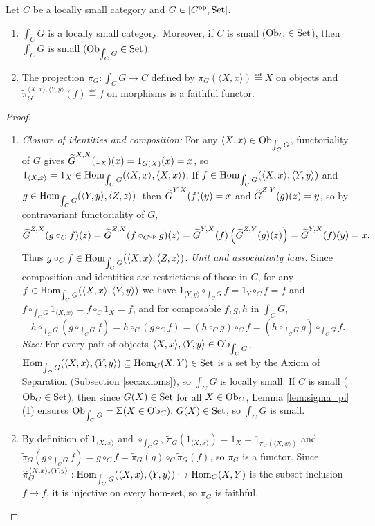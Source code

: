 \documentclass[10pt,a4paper]{article}
\renewcommand{\myprf}{\begin{proof}}
\renewcommand{\myqed}{\end{proof}}
\begin{document}
\begin{lemma}\label{lem:cat_of_elements}
Let $C$ be a locally small category and $G \in [C^{\textrm{op}}, {\textrm{Set}}]$.
\begin{enumerate}
\item $\int_C G$ is a locally small category. Moreover, if $C$ is small (${\textrm{Ob}}_C \in {\textrm{Set}}$), then $\int_C G$ is small (${\textrm{Ob}}_{\int_C G} \in {\textrm{Set}}$).
\item The projection $\pi_G : \int_C G \to C$ defined by $\pi_G(\langle X, x \rangle) \eqdef X$ on objects and $\widetilde{\pi}_G^{\langle X,x\rangle,\langle Y,y\rangle}(f) \eqdef f$ on morphisms is a faithful functor.
\end{enumerate}
\end{lemma}
\myprf
\begin{enumerate}
\item \emph{Closure of identities and composition:} For any $\langle X, x \rangle \in {\textrm{Ob}}_{\int_C G}$, functoriality of $G$ gives ${\widetilde{G}\textrm{}}^{X,X}(1_X)(x) = 1_{G(X)}(x) = x$, so $1_{\langle X,x\rangle} = 1_X \in {\textrm{Hom}}_{\int_C G}(\langle X, x \rangle, \langle X, x \rangle)$. If $f \in {\textrm{Hom}}_{\int_C G}(\langle X, x \rangle, \langle Y, y \rangle)$ and $g \in {\textrm{Hom}}_{\int_C G}(\langle Y, y \rangle, \langle Z, z \rangle)$, then ${\widetilde{G}\textrm{}}^{Y,X}(f)(y) = x$ and ${\widetilde{G}\textrm{}}^{Z,Y}(g)(z) = y$, so by contravariant functoriality of $G$,
$${\widetilde{G}\textrm{}}^{Z,X}(g \circ_C f)(z) = {\widetilde{G}\textrm{}}^{Z,X}(f \circ_{C^{\textrm{op}}} g)(z) = {\widetilde{G}\textrm{}}^{Y,X}(f)\left({\widetilde{G}\textrm{}}^{Z,Y}(g)(z)\right) = {\widetilde{G}\textrm{}}^{Y,X}(f)(y) = x.$$
Thus $g \circ_C f \in {\textrm{Hom}}_{\int_C G}(\langle X, x \rangle, \langle Z, z \rangle)$.
\emph{Unit and associativity laws:} Since composition and identities are restrictions of those in $C$, for any $f \in {\textrm{Hom}}_{\int_C G}(\langle X,x\rangle, \langle Y,y\rangle)$ we have $1_{\langle Y,y\rangle} \circ_{\int_C G} f = 1_Y \circ_C f = f$ and $f \circ_{\int_C G} 1_{\langle X,x\rangle} = f \circ_C 1_X = f$, and for composable $f, g, h$ in $\int_C G$,
$$h \circ_{\int_C G} \left(g \circ_{\int_C G} f\right) = h \circ_C (g \circ_C f) = (h \circ_C g) \circ_C f = \left(h \circ_{\int_C G} g\right) \circ_{\int_C G} f.$$
\emph{Size:} For every pair of objects $\langle X,x \rangle, \langle Y,y \rangle \in {\textrm{Ob}}_{\int_C G}$, ${\textrm{Hom}}_{\int_C G}(\langle X,x \rangle, \langle Y,y \rangle) \subseteq {\textrm{Hom}}_C(X,Y) \in {\textrm{Set}}$ is a set by the Axiom of Separation (Subsection \ref{sec:axioms}), so $\int_C G$ is locally small. If $C$ is small (${\textrm{Ob}}_C \in {\textrm{Set}}$), then since $G(X) \in {\textrm{Set}}$ for all $X \in {\textrm{Ob}}_C$, Lemma \ref{lem:sigma_pi}(1) ensures ${\textrm{Ob}}_{\int_C G} = \Sigma(X \in {\textrm{Ob}}_C).\ G(X) \in {\textrm{Set}}$, so $\int_C G$ is small.
\item By definition of $1_{\langle X,x\rangle}$ and $\circ_{\int_C G}$, $\widetilde{\pi}_G(1_{\langle X,x\rangle}) = 1_X = 1_{\pi_G(\langle X,x\rangle)}$ and $\widetilde{\pi}_G(g \circ_{\int_C G} f) = g \circ_C f = \widetilde{\pi}_G(g) \circ_C \widetilde{\pi}_G(f)$, so $\pi_G$ is a functor. Since $\widetilde{\pi}_G^{\langle X,x\rangle, \langle Y,y\rangle} : {\textrm{Hom}}_{\int_C G}(\langle X,x \rangle, \langle Y,y \rangle) \hookrightarrow {\textrm{Hom}}_C(X,Y)$ is the subset inclusion $f \mapsto f$, it is injective on every hom-set, so $\pi_G$ is faithful.
\end{enumerate}
\myqed
\end{document}

